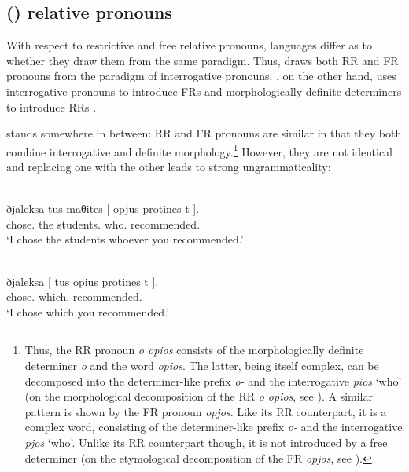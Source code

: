 \documentclass[output=paper]{langsci/langscibook}
\begin{document}
\subsection{() relative pronouns}\label{sub:key:01.2.2}

With respect to restrictive and free relative pronouns, languages differ as to
whether they draw them from the same paradigm. Thus,  draws both
\gls{RR} and \gls{FR} pronouns from the paradigm of interrogative pronouns.
, on the other hand, uses interrogative pronouns to introduce \glspl{FR} and
morphologically definite determiners to introduce \glspl{RR} \citep{Wiltschko1998}.

 stands somewhere in between: \gls{RR} and \gls{FR} pronouns are similar
in that they both combine interrogative and definite morphology.\footnote{
    Thus, the \gls{RR} pronoun \emph{o opios} consists of the morphologically
    definite determiner \emph{o} and the word \emph{opios}. The latter,
    being itself complex, can be decomposed into the determiner-like prefix
    \emph{o-} and the interrogative \emph{pios} ‘who’ (on the morphological
    decomposition of the \gls{RR} \emph{o opios}, see
    \citealt{Alexiadou1998}). A similar pattern is shown by the \gls{FR} pronoun
    \emph{opjos}. Like its \gls{RR} counterpart, it is a complex word,
    consisting of the determiner-like prefix \emph{o-} and the interrogative
    \emph{pjos} ‘who’. Unlike its \gls{RR} counterpart though, it is not
    introduced by a free determiner (on the etymological decomposition of the
    \gls{FR} \emph{opjos}, see \citealt{Chila-Markopoulou1994}).} However,
    they are not identical and replacing one with the other leads to strong
    ungrammaticality:

\ea {}\label{ex:key:01.4}\\
    \gll \llap{*}ðjaleksa tus maθites [ opjus protines t ].\\
    chose.\Fsg{} the students.\Acc{} {} who.\Acc{} recommended.\Ssg{} {}\\
    \trans *\enquote*{I chose the students whoever you recommended.}
\z

\ea {}\label{ex:key:01.5}\\
    \gll \llap{*}ðjaleksa [ {tus opius} protines t ].\\
    chose.\Fsg{} {} which.\Acc{} recommended.\Ssg{} {}\\
    \trans *\enquote*{I chose which you recommended.}
\z
\end{document}
